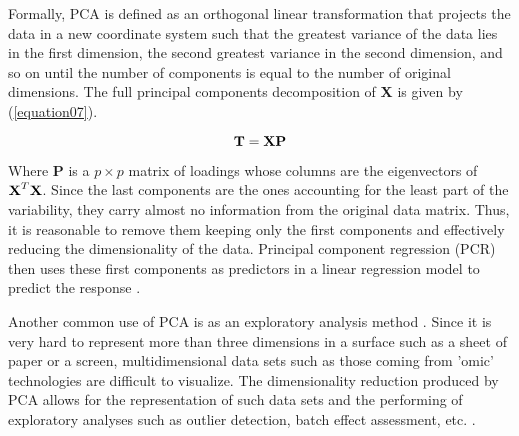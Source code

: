 Formally, PCA is defined as an orthogonal linear transformation that projects the data in a new coordinate system such that the greatest variance of the data lies in the first dimension, the second greatest variance in the second dimension, and so on until the number of components is equal to the number of original dimensions. The full principal components decomposition of \textbf{X} is given by (\autoref{equation07}).

\begin{equation}
\label{equation07}
\textbf{\text{T}} = \textbf{\text{XP}}
\end{equation}

Where \textbf{P} is a $p \times p$ matrix of loadings whose columns are the eigenvectors of $\textbf{\text{X}}^T\textbf{\text{X}}$. Since the last components are the ones accounting for the least part of the variability, they carry almost no information from the original data matrix. Thus, it is reasonable to remove them keeping only the first components and effectively reducing the dimensionality of the data. Principal component regression (PCR) then uses these first components as predictors in a linear regression model to predict the response \parencite{jolliffe1982note}.

Another common use of PCA is as an exploratory analysis method \parencite{tsai2007dimensionality}. Since it is very hard to represent more than three dimensions in a surface such as a sheet of paper or a screen, multidimensional data sets such as those coming from 'omic' technologies are difficult to visualize. The dimensionality reduction produced by PCA allows for the representation of such data sets and the performing of exploratory analyses such as outlier detection, batch effect assessment, etc. \parencite{meglen1992examining}.
